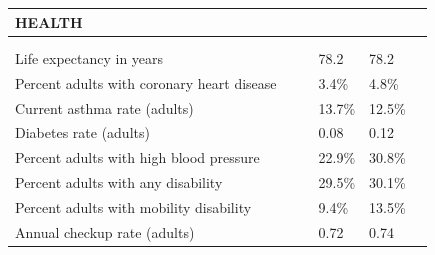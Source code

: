 \documentclass[9pt]{report}
\begin{document}
\newpage
\setlength{\tabcolsep}{.01in} %
\begin{tabular}{p{.10in}p{.10in}p{.10in}p{3.7in}>{\hfill}p{.85in}>{\hfill}p{.85in}>{\hfill}p{.85in}>{\hfill}p{.85in}p{0.1in}}
\multicolumn{9}{l}{\parbox{7.1in}{\raggedright{\large{\strut\textbf{HEALTH}\strut}}}} \\ 
\hline
\multicolumn{4}{l}{\parbox{3.5in}{\raggedright{\textbf{}}}} & \multicolumn{1}{r}{\parbox{.85in}{\strut\raggedleft{\textbf{}\strut}}} & \multicolumn{1}{r}{\parbox{.85in}{\strut\raggedleft{\textbf{}\strut}}} & \multicolumn{1}{r}{\parbox{.85in}{\strut{}}} & \multicolumn{1}{r}{\parbox{.85in}{\strut{}}} & \\ 
\multicolumn{9}{l}{} \\ 
\multicolumn{4}{l}{\parbox{3.6in}{\strut\raggedright{{Life expectancy in years}}\strut}} &  &  & 78.2 & 78.2 & \multicolumn{1}{l}{}  \\ 
\multicolumn{4}{l}{\parbox{3.6in}{\strut\raggedright{{Percent adults with coronary heart disease}}\strut}} &  &  & 3.4\% & 4.8\% & \multicolumn{1}{l}{}  \\ 
\multicolumn{4}{l}{\parbox{3.6in}{\strut\raggedright{{Current asthma rate (adults)}}\strut}} &  &  & 13.7\% & 12.5\% & \multicolumn{1}{l}{}  \\ 
\multicolumn{4}{l}{\parbox{3.6in}{\strut\raggedright{{Diabetes rate (adults)}}\strut}} &  &  & 0.08 & 0.12 & \multicolumn{1}{l}{}  \\ 
\multicolumn{4}{l}{\parbox{3.6in}{\strut\raggedright{{Percent adults with high blood pressure}}\strut}} &  &  & 22.9\% & 30.8\% & \multicolumn{1}{l}{}  \\ 
\multicolumn{4}{l}{\parbox{3.6in}{\strut\raggedright{{Percent adults with any disability}}\strut}} &  &  & 29.5\% & 30.1\% & \multicolumn{1}{l}{}  \\ 
\multicolumn{4}{l}{\parbox{3.6in}{\strut\raggedright{{Percent adults with mobility disability}}\strut}} &  &  & 9.4\% & 13.5\% & \multicolumn{1}{l}{}  \\ 
\multicolumn{4}{l}{\parbox{3.6in}{\strut\raggedright{{Annual checkup rate (adults)}}\strut}} &  &  & 0.72 & 0.74 & \multicolumn{1}{l}{}  \\ 

\end{tabular}
\end{document}
